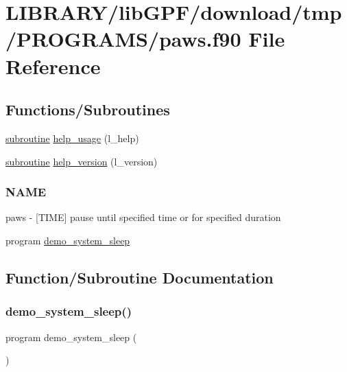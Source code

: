 \hypertarget{paws_8f90}{}\section{L\+I\+B\+R\+A\+R\+Y/lib\+G\+P\+F/download/tmp/\+P\+R\+O\+G\+R\+A\+M\+S/paws.f90 File Reference}
\label{paws_8f90}
\subsection*{Functions/\+Subroutines}
\begin{DoxyCompactItemize}
\item 
\hyperlink{M__stopwatch_83_8txt_acfbcff50169d691ff02d4a123ed70482}{subroutine} \hyperlink{paws_8f90_a3e09a3b52ee8fb04eeb93fe5761626a8}{help\+\_\+usage} (l\+\_\+help)
\item 
\hyperlink{M__stopwatch_83_8txt_acfbcff50169d691ff02d4a123ed70482}{subroutine} \hyperlink{paws_8f90_a39c21619b08a3c22f19e2306efd7f766}{help\+\_\+version} (l\+\_\+version)
\begin{DoxyCompactList}\small\item\em \subsubsection*{N\+A\+ME}

paws -\/ \mbox{[}T\+I\+ME\mbox{]} pause until specified time or for specified duration \end{DoxyCompactList}\item 
program \hyperlink{paws_8f90_adea2b9826964203f987d029f48afa37a}{demo\+\_\+system\+\_\+sleep}
\end{DoxyCompactItemize}


\subsection{Function/\+Subroutine Documentation}
\mbox{\label{paws_8f90_adea2b9826964203f987d029f48afa37a}} 
\subsubsection{\texorpdfstring{demo\+\_\+system\+\_\+sleep()}{demo\_system\_sleep()}}
{\footnotesize\ttfamily program demo\+\_\+system\+\_\+sleep (\begin{DoxyParamCaption}{ }\end{DoxyParamCaption})}



